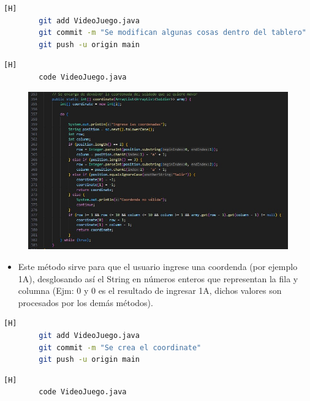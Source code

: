 \documentclass{article}
\begin{document}
	\begin{lstlisting}[language=bash,caption={Commit: a0f41647ec8dad5414cdd80eeac576c145bc032f}][H]
		git add VideoJuego.java
		git commit -m "Se modifican algunas cosas dentro del tablero"			
		git push -u origin main
	\end{lstlisting}	




	\begin{lstlisting}[language=bash,caption={Se implementa el método que recibe una coordenada }][H]
		code VideoJuego.java
	\end{lstlisting}
	
	\begin{figure}[H]
		\centering
		\includegraphics[width=1\textwidth,keepaspectratio]{img/coordinate.jpg}
	\end{figure}
	
	
	\begin{itemize}	
		\item Este método sirve para que el usuario ingrese una coordenda (por ejemplo 1A), desglosando así el String en números enteros que representan la fila y columna (Ejm: 0 y 0 es el resultado de ingresar 1A, dichos valores son procesados por los demás métodos).
	\end{itemize}
	
	\begin{lstlisting}[language=bash,caption={Commit: 0350a4047a04c3909a8829c31ee143472164c509}][H]
		git add VideoJuego.java
		git commit -m "Se crea el coordinate"			
		git push -u origin main
	\end{lstlisting}
	


	\begin{lstlisting}[language=bash,caption={Se implementa el método que da una dirección de movimiento }][H]
		code VideoJuego.java
	\end{lstlisting}
	
\end{document}
